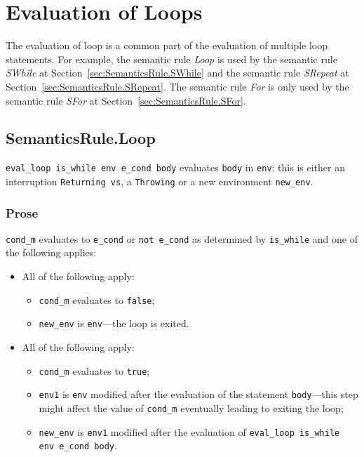\documentclass{book}
\begin{document}

\chapter{Evaluation of Loops \label{chap:eval_loops}}

The evaluation of loop is a common part of the evaluation of multiple loop
statements.
%
For example, the semantic rule \emph{Loop} is used by the semantic rule
\emph{SWhile} at Section~\ref{sec:SemanticsRule.SWhile} and the semantic rule
\emph{SRepeat} at Section~\ref{sec:SemanticsRule.SRepeat}.
%
The semantic rule \emph{For} is only used by the semantic rule \emph{SFor} at
Section~\ref{sec:SemanticsRule.SFor}.

\section{SemanticsRule.Loop \label{sec:SemanticsRule.Loop}}
\texttt{eval\_loop is\_while env e\_cond body} evaluates \texttt{body} in
\texttt{env}: this is either an interruption \texttt{Returning vs}, a
\texttt{Throwing} or a new environment \texttt{new\_env}.

    \subsection{Prose}
    \texttt{cond\_m} evaluates to \texttt{e\_cond} or \texttt{not e\_cond} as
determined by \texttt{is\_while} and one of the following applies:
    \begin{itemize}
    \item All of the following apply:
      \begin{itemize}
      \item \texttt{cond\_m} evaluates to \texttt{false};
      \item \texttt{new\_env} is \texttt{env}---the loop is exited.
      \end{itemize}
    \item All of the following apply:
      \begin{itemize}
      \item \texttt{cond\_m} evaluates to \texttt{true};
      \item \texttt{env1} is \texttt{env} modified after the evaluation of the
statement \texttt{body}---this step might affect the value of \texttt{cond\_m}
eventually leading to exiting the loop;
      \item \texttt{new\_env} is \texttt{env1} modified after the evaluation of
\texttt{eval\_loop is\_while env e\_cond body}.
      \end{itemize}
    \end{itemize}
\end{document}
